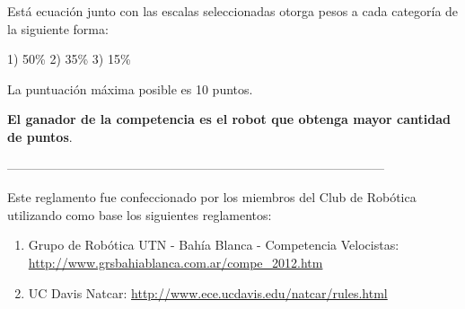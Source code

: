 \documentclass[a4paper,11pt]{article}
\begin{document}
Está ecuación junto con las escalas seleccionadas otorga pesos a cada categoría de la siguiente forma:

1) 50\%  2) 35\%  3) 15\%

La puntuación máxima posible es 10 puntos.

\textbf{El ganador de la competencia es el robot que obtenga mayor cantidad de puntos}.

------------------------------------------------------------------------------------------

Este reglamento fue confeccionado por los miembros del Club de Robótica utilizando como base los siguientes reglamentos:

\begin{enumerate}
  \item Grupo de Robótica UTN - Bahía Blanca - Competencia Velocistas: \\
    \url{http://www.grsbahiablanca.com.ar/compe_2012.htm}
  \item UC Davis Natcar: \url{http://www.ece.ucdavis.edu/natcar/rules.html}
\end{enumerate}
\end{document}
